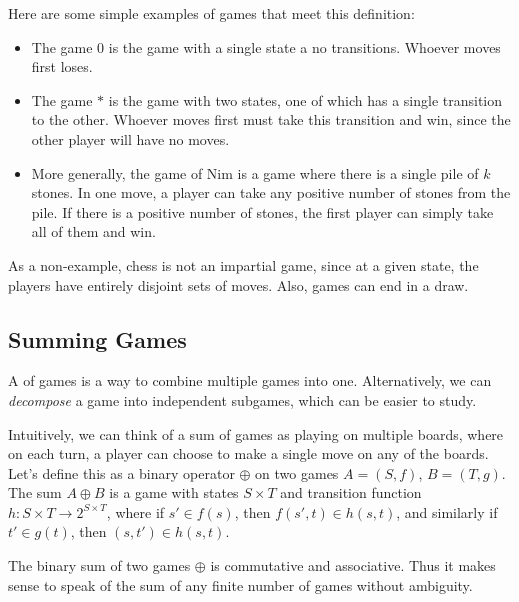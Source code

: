 \documentclass[11pt]{scrartcl}
\begin{document}
\begin{definition}
  \begin{example}
  Here are some simple examples of games that meet this definition:
    \begin{itemize}
  \item The game $0$ is the game with a single state a no transitions.
    Whoever moves first loses.
    \item The game $*$ is the game with two states, one of which has a single transition to the other.
      Whoever moves first must take this transition and win, since the other player will have no moves.
    \item More generally, the game of Nim is a game where there is a single pile of $k$ stones.
      In one move, a player can take any positive number of stones from the pile.
      If there is a positive number of stones, the first player can simply take all of them and win.
    \end{itemize}

    As a non-example, chess is not an impartial game, since at a given state, the players have entirely disjoint sets of moves.
      Also, games can end in a draw.
  \end{example}

  \subsection{Summing Games}

  A  of games is a way to combine multiple games into one.
    Alternatively, we can \textit{decompose} a game into independent subgames, which can be easier to study.
  \begin{definition}
    Intuitively, we can think of a sum of games as playing on multiple boards, where on each turn, a player can choose to make a single move on any of the boards.
    Let's define this as a binary operator $\oplus$ on two games $A = (S, f)$, $B = (T, g)$.
    The sum $A \oplus B$ is a game with states $S \times T$ and transition function $h : S \times T \to 2^{S \times T}$, where if $s' \in f(s)$, then $f(s', t) \in h(s, t)$,
    and similarly if $t' \in g(t)$, then $(s, t') \in h(s, t)$.
  \end{definition}

  \begin{lemma}
  The binary sum of two games $\oplus$ is commutative and associative.
  Thus it makes sense to speak of the sum of any finite number of games without ambiguity.
  \end{lemma}


\end{definition}
\end{document}
